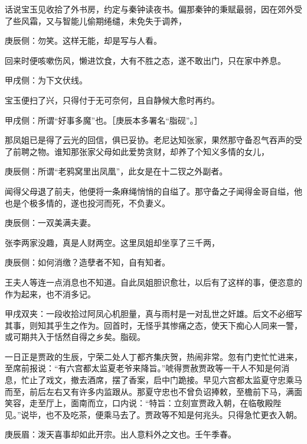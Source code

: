 \begin{parag}
    话说宝玉见收拾了外书房，约定与秦钟读夜书。偏那秦钟的秉赋最弱，因在郊外受了些风霜，又与智能儿偷期绻缱，未免失于调养，\begin{note}庚辰侧：勿笑。这样无能，却是写与人看。\end{note}回来时便咳嗽伤风，懒进饮食，大有不胜之态，遂不敢出门，只在家中养息。\begin{note}甲戌侧：为下文伏线。\end{note}宝玉便扫了兴，只得付于无可奈何，且自静候大愈时再约。\begin{note}甲戌侧：所谓“好事多魔”也。［庚辰本多署名“脂砚”。］\end{note}
\end{parag}


\begin{parag}
    那凤姐已是得了云光的回信，俱已妥协。老尼达知张家，果然那守备忍气吞声的受了前聘之物。谁知那张家父母如此爱势贪财，却养了个知义多情的女儿，\begin{note}庚辰侧：所谓“老鸦窝里出凤凰”，此女是在十二钗之外副者。\end{note}闻得父母退了前夫，他便将一条麻绳悄悄的自缢了。那守备之子闻得金哥自缢，他也是个极多情的，遂也投河而死，不负妻义。\begin{note}庚辰侧：一双美满夫妻。\end{note}张李两家没趣，真是人财两空。这里凤姐却坐享了三千两，\begin{note}庚辰侧：如何消缴？造孽者不知，自有知者。\end{note}王夫人等连一点消息也不知道。自此凤姐胆识愈壮，以后有了这样的事，便恣意的作为起来，也不消多记。\begin{note}甲戌双夹：一段收拾过阿凤心机胆量，真与雨村是一对乱世之奸雄。后文不必细写其事，则知其乎生之作为。回首时，无怪乎其惨痛之态，使天下痴心人同来一警，或可期共入于恬然自得之乡矣。脂砚。\end{note}
\end{parag}


\begin{parag}
    一日正是贾政的生辰，宁荣二处人丁都齐集庆贺，热闹非常。忽有门吏忙忙进来，至席前报说：“有六宫都太监夏老爷来降旨。”唬得贾赦贾政等一干人不知是何消息，忙止了戏文，撤去酒席，摆了香案，启中门跪接。早见六宫都太监夏守忠乘马而至，前后左右又有许多内监跟从。那夏守忠也不曾负诏捧敕，至檐前下马，满面笑容，走至厅上，面南而立，口内说：“特旨：立刻宣贾政入朝，在临敬殿陛见。”说毕，也不及吃茶，便乘马去了。贾政等不知是何兆头。只得急忙更衣入朝。\begin{note}庚辰眉：泼天喜事却如此开宗。出人意料外之文也。壬午季春。\end{note}
\end{parag}


